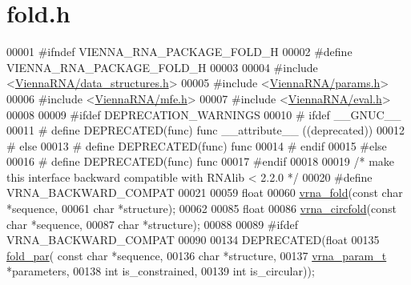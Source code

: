 \hypertarget{fold_8h_source}{}\section{fold.\+h}
\label{fold_8h_source}

\begin{DoxyCode}
00001 \textcolor{preprocessor}{#ifndef VIENNA\_RNA\_PACKAGE\_FOLD\_H}
00002 \textcolor{preprocessor}{#define VIENNA\_RNA\_PACKAGE\_FOLD\_H}
00003 
00004 \textcolor{preprocessor}{#include <\hyperlink{data__structures_8h}{ViennaRNA/data\_structures.h}>}
00005 \textcolor{preprocessor}{#include <\hyperlink{params_8h}{ViennaRNA/params.h}>}
00006 \textcolor{preprocessor}{#include <\hyperlink{mfe_8h}{ViennaRNA/mfe.h}>}
00007 \textcolor{preprocessor}{#include <\hyperlink{eval_8h}{ViennaRNA/eval.h}>}
00008 
00009 \textcolor{preprocessor}{#ifdef DEPRECATION\_WARNINGS}
00010 \textcolor{preprocessor}{# ifdef \_\_GNUC\_\_}
00011 \textcolor{preprocessor}{#  define DEPRECATED(func) func \_\_attribute\_\_ ((deprecated))}
00012 \textcolor{preprocessor}{# else}
00013 \textcolor{preprocessor}{#  define DEPRECATED(func) func}
00014 \textcolor{preprocessor}{# endif}
00015 \textcolor{preprocessor}{#else}
00016 \textcolor{preprocessor}{# define DEPRECATED(func) func}
00017 \textcolor{preprocessor}{#endif}
00018 
00019 \textcolor{comment}{/* make this interface backward compatible with RNAlib < 2.2.0 */}
00020 \textcolor{preprocessor}{#define VRNA\_BACKWARD\_COMPAT}
00021 
00059 \textcolor{keywordtype}{float}
00060 \hyperlink{group__mfe__fold__single_ga29a33b2895f4e67b0480271ff289afdc}{vrna\_fold}(\textcolor{keyword}{const} \textcolor{keywordtype}{char} *sequence,
00061           \textcolor{keywordtype}{char} *structure);
00062 
00085 \textcolor{keywordtype}{float}
00086 \hyperlink{group__mfe__fold__single_gaf973483d8acbc8cc9aacfc8a9b7f0074}{vrna\_circfold}(\textcolor{keyword}{const} \textcolor{keywordtype}{char} *sequence,
00087               \textcolor{keywordtype}{char} *structure);
00088 
00089 \textcolor{preprocessor}{#ifdef  VRNA\_BACKWARD\_COMPAT}
00090 
00134 DEPRECATED(\textcolor{keywordtype}{float}
00135 \hyperlink{group__mfe__fold__single_ga2bc41df5d71fee6fd8da9904ee65d8fb}{fold\_par}( \textcolor{keyword}{const} \textcolor{keywordtype}{char} *sequence,
00136           \textcolor{keywordtype}{char} *structure,
00137           \hyperlink{group__energy__parameters_structvrna__param__s}{vrna\_param\_t} *parameters,
00138           \textcolor{keywordtype}{int} is\_constrained,
00139           \textcolor{keywordtype}{int} is\_circular));

\end{DoxyCode}
